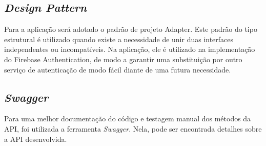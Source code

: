 \subsection{\textit{Design Pattern}}
Para a aplicação será adotado o padrão de projeto Adapter. Este padrão do tipo estrutural é utilizado quando existe a necessidade de unir duas interfaces independentes ou incompatíveis. Na aplicação, ele é utilizado na implementação do Firebase Authentication, de modo a garantir uma substituição por outro serviço de autenticação de modo fácil diante de uma futura necessidade.

\subsection{\textit{Swagger}}
Para uma melhor documentação do código e testagem manual dos métodos da API, foi utilizada a ferramenta \textit{Swagger}. Nela, pode ser encontrada detalhes sobre a API desenvolvida.



